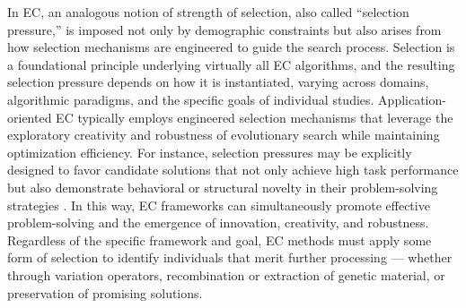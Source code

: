 
In EC, an analogous notion of strength of selection, also called ``selection pressure,'' is imposed not only by demographic constraints but also arises from how selection mechanisms are engineered to guide the search process.
Selection is a foundational principle underlying virtually all EC algorithms, and the resulting selection pressure depends on how it is instantiated, varying across domains, algorithmic paradigms, and the specific goals of individual studies.
Application-oriented EC typically employs engineered selection mechanisms that leverage the exploratory creativity and robustness of evolutionary search while maintaining optimization efficiency.
For instance, selection pressures may be explicitly designed to favor candidate solutions that not only achieve high task performance but also demonstrate behavioral or structural novelty in their problem-solving strategies \citep{mouret2015illuminating,lehman2011novelty}.
In this way, EC frameworks can simultaneously promote effective problem-solving and the emergence of innovation, creativity, and robustness.
Regardless of the specific framework and goal, EC methods must apply some form of selection to identify individuals that merit further processing --- whether through variation operators, recombination or extraction of genetic material, or preservation of promising solutions.


